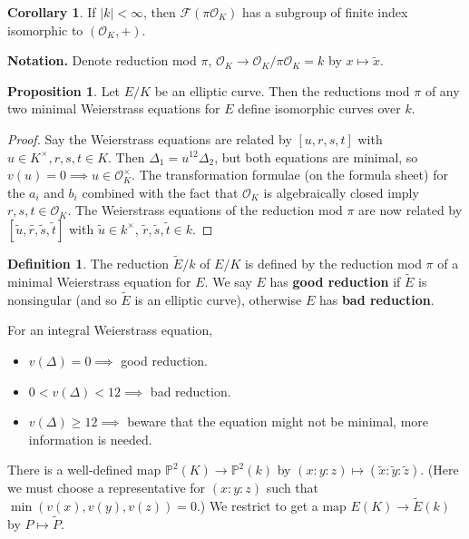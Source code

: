 \documentclass{article}
\theoremstyle{definition}
\newtheorem{cor}[theorem]{Corollary}
\newtheorem{prop}[theorem]{Proposition}
\newtheorem{defn}{Definition}[section]
\begin{document}
\begin{cor}
    If $\left|k\right|<\infty$, then $\mathcal{F}(\pi \mathcal{O}_K)$ has a subgroup of finite index isomorphic to $(\mathcal{O}_K,+)$.
\end{cor}
\textbf{Notation.} Denote reduction mod $\pi$, $\mathcal{O}_K \to \mathcal{O}_K/\pi \mathcal{O}_K = k$ by $x \mapsto \widetilde{x}$.
\begin{prop}\label{prop9.4}
    Let $E/K$ be an elliptic curve. Then the reductions mod $\pi$ of any two minimal Weierstrass equations for $E$ define isomorphic curves over $k$.
\end{prop}  
\begin{proof}
    Say the Weierstrass equations are related by $[u,r,s,t]$ with $u \in K^\times, r,s,t \in K$. Then $\Delta_1 = u^{12}\Delta_2$, but both equations are minimal, so $v(u) = 0 \implies u \in \mathcal{O}_K^\times$. The transformation formulae (on the formula sheet) for the $a_i$ and $b_i$ combined with the fact that $\mathcal{O}_K$ is algebraically closed imply $r,s,t \in \mathcal{O}_K$. The Weierstrass equations of the reduction mod $\pi$ are now related by $[\widetilde{u},\widetilde{r,}\widetilde{s},\widetilde{t}]$ with $\widetilde{u} \in k^\times$, $\widetilde{r},\widetilde{s},\widetilde{t} \in k$.
\end{proof}
\begin{defn}
    The reduction $\widetilde{E}/k$ of $E/K$ is defined by the reduction mod $\pi$ of a minimal Weierstrass equation for $E$. We say $E$ has \textbf{good reduction} if $\widetilde{E}$ is nonsingular (and so $\widetilde{E}$ is an elliptic curve), otherwise $E$ has \textbf{bad reduction}.
\end{defn}
For an integral Weierstrass equation,
\begin{itemize}
    \item $v(\Delta)=0 \implies$ good reduction.
    \item $0<v(\Delta)<12 \implies $ bad reduction.
    \item $v(\Delta)\ge 12 \implies $ beware that the equation might not be minimal, more information is needed. 
\end{itemize}
There is a well-defined map $\mathbb{P}^2(K) \to \mathbb{P}^2(k)$ by $(x:y:z) \mapsto (\widetilde{x}:\widetilde{y}:\widetilde{z})$. (Here we must choose a representative for $(x:y:z)$ such that $\min(v(x),v(y),v(z))=0$.) We restrict to get a map $E(K) \to \widetilde{E}(k)$ by $P \mapsto \widetilde{P}$. 
\vspace{1mm}
 
\end{document}
